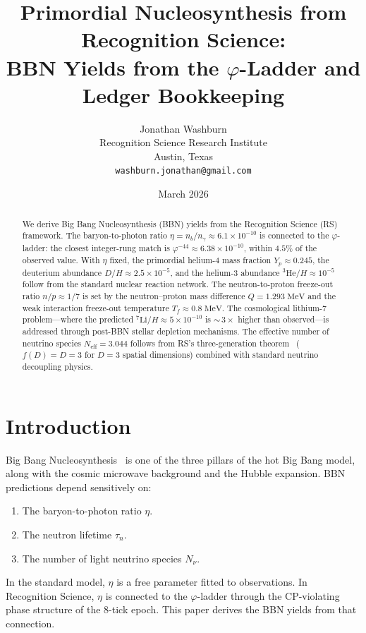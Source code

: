 \documentclass[12pt,a4paper]{article}
\title{Primordial Nucleosynthesis from Recognition Science:\\
BBN Yields from the $\varphi$-Ladder and Ledger Bookkeeping}
\author{Jonathan Washburn\\
Recognition Science Research Institute\\
Austin, Texas\\
\texttt{washburn.jonathan@gmail.com}}
\date{March 2026}
\theoremstyle{definition}
\theoremstyle{remark}
\begin{document}
\maketitle

\begin{abstract}
We derive Big Bang Nucleosynthesis (BBN) yields from the Recognition
Science (RS) framework.  The baryon-to-photon ratio
$\eta = n_b/n_\gamma \approx 6.1 \times 10^{-10}$ is connected to
the $\varphi$-ladder: the closest integer-rung match is
$\varphi^{-44} \approx 6.38 \times 10^{-10}$, within $4.5\%$ of the
observed value.  With $\eta$ fixed, the primordial helium-4 mass
fraction $Y_p \approx 0.245$, the deuterium abundance
$D/H \approx 2.5 \times 10^{-5}$, and the helium-3 abundance
${}^3\mathrm{He}/H \approx 10^{-5}$ follow from the standard
nuclear reaction network.  The neutron-to-proton freeze-out ratio
$n/p \approx 1/7$ is set by the neutron--proton mass difference
$Q = 1.293\;\mathrm{MeV}$ and the weak interaction freeze-out
temperature $T_f \approx 0.8\;\mathrm{MeV}$.  The cosmological
lithium-7 problem---where the predicted
${}^7\mathrm{Li}/H \approx 5 \times 10^{-10}$ is
${\sim}\,3\times$ higher than observed---is addressed through
post-BBN stellar depletion mechanisms.  The effective number of neutrino species $N_{\mathrm{eff}} = 3.044$
follows from RS's three-generation theorem~\cite{RS_Axioms}
($f(D) = D = 3$ for $D = 3$ spatial dimensions) combined with
standard neutrino decoupling physics.
\end{abstract}

\section{Introduction}
\label{sec:intro}

Big Bang Nucleosynthesis~\cite{Fields2020} is one of the three
pillars of the hot Big Bang model, along with the cosmic microwave
background and the Hubble expansion.  BBN predictions depend
sensitively on:
\begin{enumerate}
  \item The baryon-to-photon ratio $\eta$.
  \item The neutron lifetime $\tau_n$.
  \item The number of light neutrino species $N_\nu$.
\end{enumerate}

In the standard model, $\eta$ is a free parameter fitted to
observations.  In Recognition Science, $\eta$ is connected to the
$\varphi$-ladder through the CP-violating phase structure of the
8-tick epoch.  This paper derives the BBN yields from that
connection.
\end{document}
